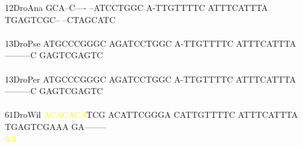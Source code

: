 \documentclass[11pt,twoside,reqno,a4paper]{article}
\begin{document}
{12\hspace*{2\charwidth}DroAna	GCA--C----	--ATCCTGGC	A-TTGTTTTC	ATTTCATTTA	TGAGTCGC--	--CTAGCATC	\\
\hspace*{4\charwidth}\hspace*{7\charwidth}\hspace*{1\charwidth}\hspace*{1\charwidth}\hspace*{1\charwidth}\hspace*{1\charwidth}\hspace*{1\charwidth}\hspace*{1\charwidth}\\
13\hspace*{2\charwidth}DroPse	ATGCCCGGGC	AGATCCTGGC	A-TTGTTTTC	ATTTCATTTA	---------C	GAGTCGAGTC	\\
\hspace*{4\charwidth}\hspace*{7\charwidth}\hspace*{1\charwidth}\hspace*{1\charwidth}\hspace*{1\charwidth}\hspace*{1\charwidth}\hspace*{1\charwidth}\hspace*{1\charwidth}\\
13\hspace*{2\charwidth}DroPer	ATGCCCGGGC	AGATCCTGGC	A-TTGTTTTC	ATTTCATTTA	---------C	GAGTCGAGTC	\\
\hspace*{4\charwidth}\hspace*{7\charwidth}\hspace*{1\charwidth}\hspace*{1\charwidth}\hspace*{1\charwidth}\hspace*{1\charwidth}\hspace*{1\charwidth}\hspace*{1\charwidth}\\
61\hspace*{2\charwidth}DroWil	\textcolor{Yellow}{A}\textcolor{Yellow}{C}\textcolor{Yellow}{A}\textcolor{Yellow}{C}\textcolor{Yellow}{A}\textcolor{Yellow}{C}\textcolor{Yellow}{A}TCG	ACATTCGGGA	CATTGTTTTC	ATTTCATTTA	TGAGTCGAAA	GA--------	\\
\hspace*{4\charwidth}\hspace*{7\charwidth}\hspace*{0\charwidth}\textcolor{Yellow}{6.3}\hspace*{1\charwidth}\hspace*{1\charwidth}\hspace*{1\charwidth}\hspace*{1\charwidth}\hspace*{1\charwidth}\hspace*{1\charwidth}\\
}
\end{document}
